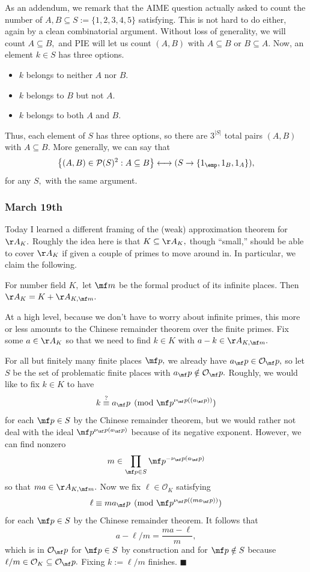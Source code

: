As an addendum, we remark that the AIME question actually asked to count the number of $A,B\subseteq S:=\{1,2,3,4,5\}$ satisfying. This is not hard to do either, again by a clean combinatorial argument. Without loss of generality, we will count $A\subseteq B,$ and PIE will let us count $(A,B)$ with $A\subseteq B$ or $B\subseteq A.$ Now, an element $k\in S$ has three options.
\begin{itemize}
    \item $k$ belongs to neither $A$ nor $B.$
    \item $k$ belongs to $B$ but not $A.$
    \item $k$ belongs to both $A$ and $B.$
\end{itemize}
Thus, each element of $S$ has three options, so there are $3^{|S|}$ total pairs $(A,B)$ with $A\subseteq B.$ More generally, we can say that
\[\left\{(A,B)\in\mathcal P(S)^2:A\subseteq B\right\}\longleftrightarrow(S\to\{1_\emp,1_B,1_A\}),\]
for any $S,$ with the same argument.

\subsubsection{March 19th}
Today I learned a different framing of the (weak) approximation theorem for $\AA_K.$ Roughly the idea here is that $K\subseteq\AA_K,$ though ``small,'' should be able to cover $\AA_K$ if given a couple of primes to move around in. In particular, we claim the following.
\begin{theorem}
    For number field $K,$ let $\mf m$ be the formal product of its infinite places. Then $\AA_K=K+\AA_{K,\mf m}.$
\end{theorem}
At a high level, because we don't have to worry about infinite primes, this more or less amounts to the Chinese remainder theorem over the finite primes. Fix some $a\in\AA_K$ so that we need to find $k\in K$ with $a-k\in\AA_{K,\mf m}.$

For all but finitely many finite places $\mf p,$ we already have $a_\mf p\in\mathcal O_\mf p,$ so let $S$ be the set of problematic finite places with $a_\mf p\notin\mathcal O_\mf p.$ Roughly, we would like to fix $k\in K$ to have
\[k\stackrel?\equiv a_\mf p\pmod{\mf p^{\nu_\mf p((a_\mf p))}}\]
for each $\mf p\in S$ by the Chinese remainder theorem, but we would rather not deal with the ideal $\mf p^{\nu_\mf p(a_\mf p)}$ because of its negative exponent. However, we can find nonzero
\[m\in\prod_{\mf p\in S}\mf p^{-\nu_\mf p(a_\mf p)}\]
so that $ma\in\AA_{K,\mf m}.$ Now we fix $\ell\in\mathcal O_K$ satisfying
\[\ell\equiv ma_\mf p\pmod{\mf p^{\nu_\mf p((ma_\mf p))}}\]
for each $\mf p\in S$ by the Chinese remainder theorem. It follows that
\[a-\ell/m=\frac{ma-\ell}m,\]
which is in $\mathcal O_\mf p$ for $\mf p\in S$ by construction and for $\mf p\notin S$ because $\ell/m\in\mathcal O_K\subseteq\mathcal O_\mf p.$ Fixing $k:=\ell/m$ finishes. $\blacksquare$

